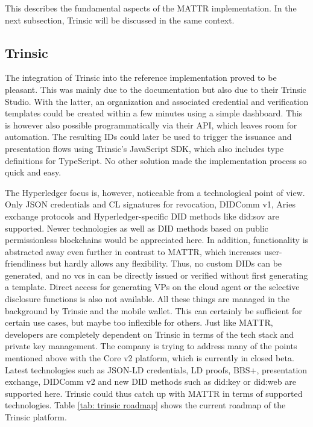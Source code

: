         This describes the fundamental aspects of the MATTR implementation. In the next subsection, Trinsic will be discussed in the same context.
    
        \subsection{Trinsic}
        
            The integration of Trinsic into the reference implementation proved to be pleasant. This was mainly due to the documentation but also due to their Trinsic Studio. With the latter, an organization and associated credential and verification templates could be created within a few minutes using a simple dashboard. This is however also possible programmatically via their API, which leaves room for automation. The resulting IDs could later be used to trigger the issuance and presentation flows using Trinsic's JavaScript SDK, which also includes type definitions for TypeScript. No other solution made the implementation process so quick and easy.
    
            The Hyperledger focus is, however, noticeable from a technological point of view. Only JSON credentials and CL signatures for revocation, DIDComm v1, Aries exchange protocols and Hyperledger-specific DID methods like did:sov are supported. Newer technologies as well as DID methods based on public permissionless blockchains would be appreciated here. In addition, functionality is abstracted away even further in contrast to MATTR, which increases user-friendliness but hardly allows any flexibility. Thus, no custom \acp{DID} can be generated, and no \acp{vc} in can be directly issued or verified without first generating a template. Direct access for generating \acp{VP} on the cloud agent or the selective disclosure functions is also not available. All these things are managed in the background by Trinsic and the mobile wallet. This can certainly be sufficient for certain use cases, but maybe too inflexible for others. Just like MATTR, developers are completely dependent on Trinsic in terms of the tech stack and private key management. The company is trying to address many of the points mentioned above with the Core v2 platform, which is currently in closed beta. Latest technologies such as JSON-LD credentials, LD proofs, BBS+, presentation exchange, DIDComm v2 and new DID methods such as did:key or did:web are supported here. Trinsic could thus catch up with MATTR in terms of supported technologies. Table \ref{tab: trinsic roadmap} shows the current roadmap of the Trinsic platform.
            \newline
    
